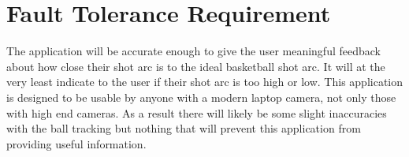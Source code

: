 \newpage
\section{Fault Tolerance Requirement}
\hspace*{4mm} The application will be accurate enough to give the user meaningful feedback about how close their shot arc is to the ideal basketball shot arc. It will at the very least indicate to the user if their shot arc is too high or low. This application is designed to be usable by anyone with a modern laptop camera, not only those with high end cameras. As a result there will likely be some slight inaccuracies with the ball tracking but nothing that will prevent this application from providing useful information. 